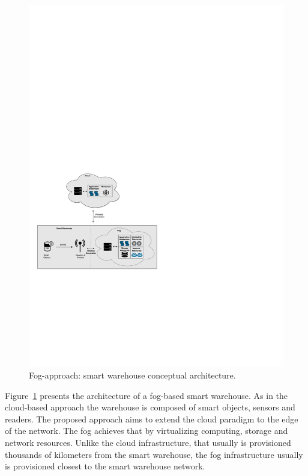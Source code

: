\begin{figure}[ht!]
  \centering
  \includegraphics[width=\textwidth]{./images/solution_fog_architecture}
  \caption{Fog-approach: smart warehouse conceptual architecture.}
  \label{fig:solution_fog_architecture}
\end{figure}

Figure~\ref{fig:solution_fog_architecture} presents the architecture of a fog-based smart warehouse.
As in the cloud-based approach the warehouse is composed of smart objects, sensors and readers.
The proposed approach aims to extend the cloud paradigm to the edge of the network. The fog achieves
that by virtualizing computing, storage and network resources. Unlike the cloud infrastructure, that
usually is provisioned thousands of kilometers from the smart warehouse, the fog infrastructure
usually is provisioned closest to the smart warehouse network.\\

